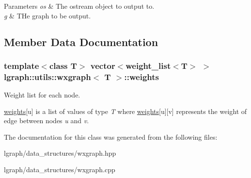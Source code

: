 \begin{DoxyParams}{Parameters}
{\em os} & The ostream object to output to. \\
\hline
{\em g} & T\-He graph to be output. \\
\hline
\end{DoxyParams}


\subsection{Member Data Documentation}
\hypertarget{classlgraph_1_1utils_1_1wxgraph_a15569c8c0fccb641709dc81eb0e29c94}{
\subsubsection[{weights}]{\setlength{\rightskip}{0pt plus 5cm}template$<$class T$>$ vector$<${\bf weight\-\_\-list}$<$T$>$ $>$ {\bf lgraph\-::utils\-::wxgraph}$<$ T $>$\-::weights\hspace{0.3cm}{\ttfamily [protected]}}}\label{classlgraph_1_1utils_1_1wxgraph_a15569c8c0fccb641709dc81eb0e29c94}


Weight list for each node. 

\hyperlink{classlgraph_1_1utils_1_1wxgraph_a15569c8c0fccb641709dc81eb0e29c94}{weights}\mbox{[}u\mbox{]} is a list of values of type {\itshape T} where \hyperlink{classlgraph_1_1utils_1_1wxgraph_a15569c8c0fccb641709dc81eb0e29c94}{weights}\mbox{[}u\mbox{]}\mbox{[}v\mbox{]} represents the weight of edge between nodes {\itshape u} and {\itshape v}. 

The documentation for this class was generated from the following files\-:\begin{DoxyCompactItemize}
\item 
lgraph/data\-\_\-structures/wxgraph.\-hpp\item 
lgraph/data\-\_\-structures/wxgraph.\-cpp\end{DoxyCompactItemize}
